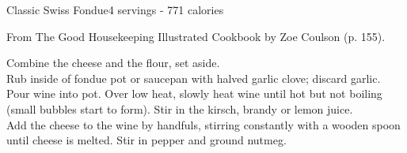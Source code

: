 \begin{recipe}{Classic Swiss Fondue}{4 servings - 771 calories}{}

\freeform From {\normalfont The Good Housekeeping Illustrated Cookbook} by Zoe Coulson (p. 155).


Combine the cheese and the flour, set aside.\\

Rub inside of fondue pot or saucepan with halved garlic clove; discard garlic.\\

Pour wine into pot. Over low heat, slowly heat wine until hot but not boiling (small bubbles start to form). Stir in the kirsch, brandy or lemon juice.\\ 

Add the cheese to the wine by handfuls, stirring constantly with a wooden spoon until cheese is melted. Stir in pepper and ground nutmeg.

\end{recipe}